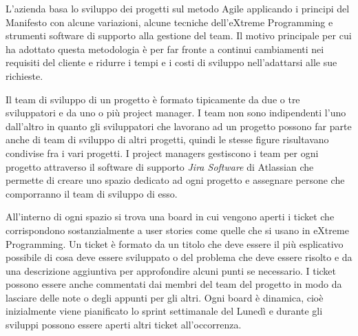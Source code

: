 \documentclass[target=bach,aauheader=,style=]{thud}
\begin{document}
L'azienda basa lo sviluppo dei progetti sul metodo Agile applicando i principi del Manifesto con alcune variazioni, alcune tecniche dell'eXtreme Programming
e strumenti software di supporto alla gestione del team.
Il motivo principale per cui ha adottato questa metodologia è per far fronte a continui cambiamenti nei requisiti del cliente e ridurre i tempi e i costi
di sviluppo nell'adattarsi alle sue richieste.

Il team di sviluppo di un progetto è formato tipicamente da due o tre sviluppatori e da uno o più project manager. I team non sono indipendenti l'uno dall'altro in quanto gli sviluppatori
che lavorano ad un progetto possono far parte anche di team di sviluppo di altri progetti, quindi le stesse figure risultavano condivise fra i vari progetti.
I project managers gestiscono i team per ogni progetto attraverso il software di supporto \textit{Jira Software} di Atlassian \cite{atlassian_jira} che permette
di creare uno spazio dedicato ad ogni progetto e assegnare persone che comporranno il team di sviluppo di esso.

All'interno di ogni spazio si trova una board in cui vengono aperti i ticket che corrispondono sostanzialmente a user stories come quelle che si usano in eXtreme Programming. Un ticket
è formato da un titolo che deve essere il più esplicativo possibile di cosa deve essere sviluppato o del problema che deve essere risolto e da una descrizione aggiuntiva per approfondire alcuni punti
se necessario. I ticket possono essere anche commentati dai membri del team del progetto in modo da lasciare delle note o degli appunti per gli altri. Ogni board è dinamica, cioè inizialmente viene
pianificato lo sprint settimanale del Lunedì e durante gli sviluppi possono essere aperti altri ticket all'occorrenza.
\end{document}
